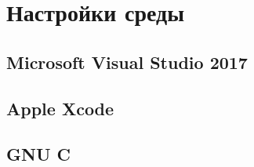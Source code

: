 \chapter{Настройки среды}

\section{Microsoft Visual Studio 2017}

\section{Apple Xcode}

\section{GNU C}
